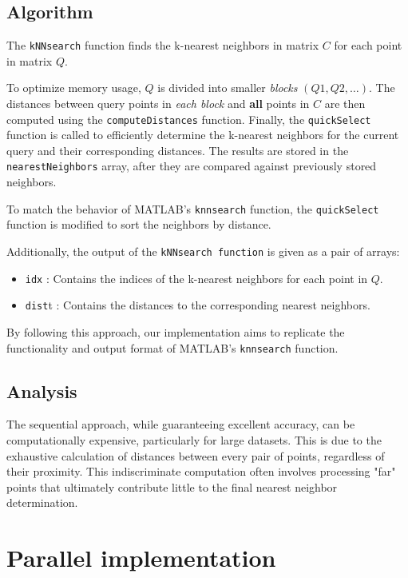 \documentclass{article}
\begin{document}
\subsection{Algorithm}

The \texttt{kNNsearch} function finds the k-nearest neighbors in matrix $C$ for each point in matrix $Q$.

To optimize memory usage, $Q$ is divided into smaller \emph{blocks} $(Q1, Q2, \dots)$. 
The distances between query points in \emph{each block} and \textbf{all} points in $C$ are then computed using the \texttt{computeDistances} function.
Finally, the \texttt{quickSelect} function is called to efficiently determine the k-nearest neighbors for the current query and their corresponding distances.
The results are stored in the \texttt{nearestNeighbors} array, after they are compared against previously stored neighbors.

To match the behavior of MATLAB's \texttt{knnsearch} function, the \texttt{quickSelect} function is modified to sort the neighbors by distance.

Additionally, the output of the \texttt{kNNsearch function} is given as a pair of arrays:
\begin{itemize}
    \item \texttt{idx} : Contains the indices of the k-nearest neighbors for each point in $Q$.
    \item \texttt{dist}t : Contains the distances to the corresponding nearest neighbors.
\end{itemize}

By following this approach, our implementation aims to replicate the functionality and output format of MATLAB's \texttt{knnsearch} function.

\subsection{Analysis}
The sequential approach, while guaranteeing excellent accuracy, can be computationally expensive, particularly for large datasets. 
This is due to the exhaustive calculation of distances between every pair of points, regardless of their proximity. 
This indiscriminate computation often involves processing "far" points that ultimately contribute little to the final nearest neighbor determination.


\section{Parallel implementation}
\end{document}
